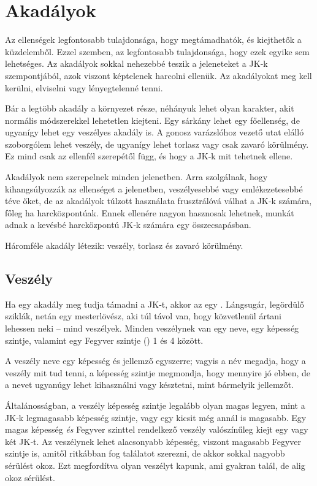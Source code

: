 \section{Akadályok}

Az ellenségek legfontosabb tulajdonsága, hogy megtámadhatók, és kiejthetők a küzdelemből. Ezzel szemben, az  legfontosabb tulajdonsága, hogy ezek egyike sem lehetséges. Az akadályok sokkal nehezebbé teszik a jeleneteket a JK‑k szempontjából, azok viszont képtelenek harcolni ellenük. Az akadályokat meg kell kerülni, elviselni vagy lényegtelenné tenni.

Bár a legtöbb akadály a környezet része, néhányuk lehet olyan karakter, akit normális módszerekkel lehetetlen kiejteni. Egy sárkány lehet egy főellenség, de ugyanígy lehet egy veszélyes akadály is. A gonosz varázslóhoz vezető utat elálló szoborgólem lehet veszély, de ugyanígy lehet torlasz vagy csak zavaró körülmény. Ez mind csak az ellenfél szerepétől függ, és hogy a JK‑k mit tehetnek ellene.

Akadályok nem szerepelnek minden jelenetben. Arra szolgálnak, hogy kihangsúlyozzák az ellenséget a jelenetben, veszélyesebbé vagy emlékezetesebbé téve őket, de az akadályok túlzott használata frusztrálóvá válhat a JK‑k számára, főleg ha harcközpontúak. Ennek ellenére nagyon hasznosak lehetnek, munkát adnak a kevésbé harcközpontú JK‑k számára egy összecsapásban.

Háromféle akadály létezik: veszély, torlasz és zavaró körülmény.

\subsection{Veszély}

Ha egy akadály meg tudja támadni a JK‑t, akkor az egy . Lángsugár, legördülő sziklák, netán egy mesterlövész, aki túl távol van, hogy közvetlenül ártani lehessen neki – mind veszélyek. Minden veszélynek van egy neve, egy képesség szintje, valamint egy Fegyver szintje () 1 és 4 között.

A veszély neve egy képesség és jellemző egyszerre; vagyis a név megadja, hogy a veszély mit tud tenni, a képesség szintje megmondja, hogy mennyire jó ebben, de a nevet ugyanúgy lehet kihasználni vagy késztetni, mint bármelyik jellemzőt.

Általánosságban, a veszély képesség szintje legalább olyan magas legyen, mint a JK‑k legmagasabb képesség szintje, vagy egy kicsit még annál is magasabb. Egy magas képesség \emph{és} Fegyver szinttel rendelkező veszély valószínűleg kiejt egy vagy két JK‑t. Az veszélynek lehet alacsonyabb képesség, viszont magasabb Fegyver szintje is, amitől ritkábban fog találatot szerezni, de akkor sokkal nagyobb sérülést okoz. Ezt megfordítva olyan veszélyt kapunk, ami gyakran talál, de alig okoz sérülést.

